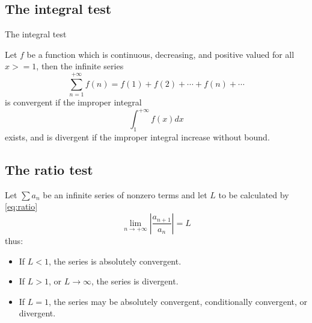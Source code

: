 \documentclass[newPxFont]{beamer}
\begin{document}
\subsection{The integral test}
\begin{frame}{The integral test}
\begin{theorem}
    Let $f$ be a function which is continuous, decreasing, and positive valued for all $x>=1$, then the infinite series
    \begin{equation*}
      \sum_{n=1}^{+\infty} f(n)=f(1)+f(2)+\cdots+f(n)+\cdots
    \end{equation*}
    is \alert{convergent} if the improper integral
    \begin{equation*}
      \int_1^{+\infty} f(x)dx
    \end{equation*}
    exists, and is \alert{divergent} if the improper integral increase without bound.
  \end{theorem}
\end{frame}
\subsection{The ratio test}
\begin{frame}
  \begin{theorem}
    Let $\sum a_n$ be an infinite series of nonzero terms and let $L$ to be calculated by \eqref{eq:ratio}
    \begin{equation}
        \lim_{n\to+\infty} \left|\frac{a_{n+1}}{a_n}\right|=L\label{eq:ratio}
      \end{equation}
thus:
\pause
    \begin{itemize}
      \item If $L<1$, the series is absolutely convergent. \pause
      \item If $L>1$, or $L\to\infty$, the series is divergent. \pause
      \item If $L=1$, the series may be absolutely convergent, conditionally convergent, or divergent.
    \end{itemize}
        \end{theorem}
\end{frame}
\end{document}

